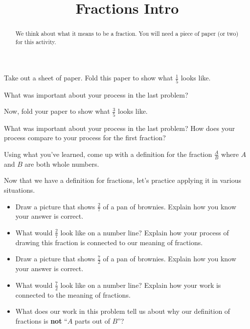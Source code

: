 \documentclass[nooutcomes,noauthor,handout]{ximera}
\title{Fractions Intro}
\begin{document}
\begin{abstract} We think about what it means to be a fraction. You will need a piece of paper (or two) for this activity. \end{abstract}
\maketitle


\begin{problem}
Take out a sheet of paper. Fold this paper to show what $\frac{1}{5}$ looks like.
\end{problem}


\begin{problem}
What was important about your process in the last problem?
\end{problem}


\begin{problem}
Now, fold your paper to show what $\frac{3}{5}$ looks like.
\end{problem}


\begin{problem}
What was important about your process in the last problem? How does your process compare to your process for the first fraction?
\end{problem}


\begin{problem}
Using what you've learned, come up with a definition for the fraction $\frac{A}{B}$ where $A$ and $B$ are both whole numbers.
\end{problem}

\newpage

Now that we have a definition for fractions, let's practice applying it in various situations. 

\begin{problem}
\begin{itemize}
	\item Draw a picture that shows $\frac{2}{7}$ of a pan of brownies. Explain how you know your answer is correct.
	\item What would $\frac{2}{7}$ look like on a number line? Explain how your process of drawing this fraction is connected to our meaning of fractions.
	\item Draw a picture that shows $\frac{7}{2}$ of a pan of brownies. Explain how you know your answer is correct.
	\item What would $\frac{7}{2}$ look like on a number line? Explain how your work is connected to the meaning of fractions. 
	\item What does our work in this problem tell us about why our definition of fractions is {\bf not} ``$A$ parts out of $B$''?
\end{itemize}
\end{problem}
\end{document}
